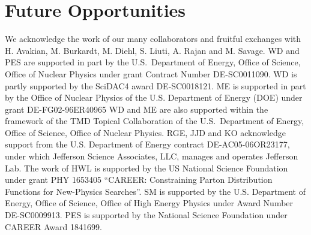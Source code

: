 \section{Future Opportunities}
\label{sec:future}



\begin{acknowledgement}
	We acknowledge the work of our many collaborators and  fruitful exchanges with H. Avakian, M. Burkardt,
	M. Diehl, S. Liuti, A. Rajan and M. Savage.
WD and PES are supported in part by the U.S.~Department of Energy, Office of Science, Office of Nuclear Physics under grant Contract Number DE-SC0011090. WD is partly supported by the SciDAC4 award DE-SC0018121.
ME is supported in part by the Office of Nuclear Physics of the
U.S. Department of Energy (DOE) under grant DE-FG02-96ER40965
WD and ME  are also supported within the framework of the TMD Topical Collaboration of the U.S.~Department of Energy, Office of Science, Office of Nuclear Physics. 
RGE, JJD and KO acknowledge support from the U.S. Department of Energy contract DE-AC05-06OR23177, under which Jefferson Science Associates, LLC, manages and operates Jefferson Lab. 
The work of HWL  is supported by the US National Science Foundation under grant PHY 1653405 “CAREER: Constraining Parton Distribution Functions for New-Physics Searches”.
SM is supported by the U.S. Department of Energy, Office of Science, Office of High Energy Physics under Award Number DE-SC0009913.
PES is supported by the National Science Foundation under CAREER Award 1841699.  
\end{acknowledgement}






